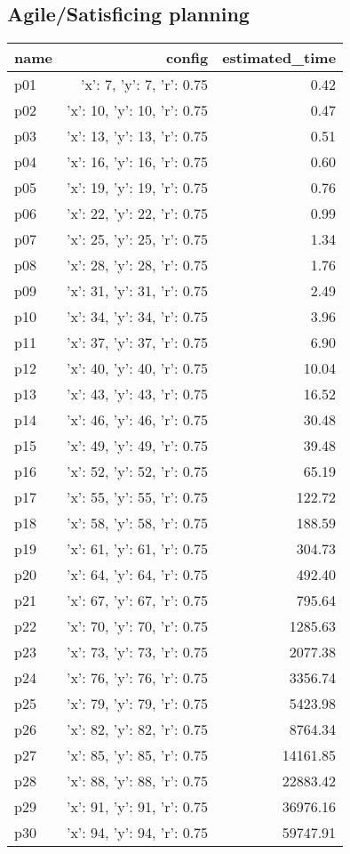 \documentclass{article}
\begin{document}
                                \subsection*{Agile/Satisficing planning}
                                
                            \begin{center}
                            \scriptsize
                            \begin{tabular}{@{}l|r|r@{}}
                            name & config & estimated\_time\\\midrule
                              p01&{'x': 7, 'y': 7, 'r': 0.75}&0.42\\
  p02&{'x': 10, 'y': 10, 'r': 0.75}&0.47\\
  p03&{'x': 13, 'y': 13, 'r': 0.75}&0.51\\
  p04&{'x': 16, 'y': 16, 'r': 0.75}&0.60\\
  p05&{'x': 19, 'y': 19, 'r': 0.75}&0.76\\
  p06&{'x': 22, 'y': 22, 'r': 0.75}&0.99\\
  p07&{'x': 25, 'y': 25, 'r': 0.75}&1.34\\
  p08&{'x': 28, 'y': 28, 'r': 0.75}&1.76\\
  p09&{'x': 31, 'y': 31, 'r': 0.75}&2.49\\
  p10&{'x': 34, 'y': 34, 'r': 0.75}&3.96\\
  p11&{'x': 37, 'y': 37, 'r': 0.75}&6.90\\
  p12&{'x': 40, 'y': 40, 'r': 0.75}&10.04\\
  p13&{'x': 43, 'y': 43, 'r': 0.75}&16.52\\
  p14&{'x': 46, 'y': 46, 'r': 0.75}&30.48\\
  p15&{'x': 49, 'y': 49, 'r': 0.75}&39.48\\
  p16&{'x': 52, 'y': 52, 'r': 0.75}&65.19\\
  p17&{'x': 55, 'y': 55, 'r': 0.75}&122.72\\
  p18&{'x': 58, 'y': 58, 'r': 0.75}&188.59\\
  p19&{'x': 61, 'y': 61, 'r': 0.75}&304.73\\
  p20&{'x': 64, 'y': 64, 'r': 0.75}&492.40\\
  p21&{'x': 67, 'y': 67, 'r': 0.75}&795.64\\
  p22&{'x': 70, 'y': 70, 'r': 0.75}&1285.63\\
  p23&{'x': 73, 'y': 73, 'r': 0.75}&2077.38\\
  p24&{'x': 76, 'y': 76, 'r': 0.75}&3356.74\\
  p25&{'x': 79, 'y': 79, 'r': 0.75}&5423.98\\
  p26&{'x': 82, 'y': 82, 'r': 0.75}&8764.34\\
  p27&{'x': 85, 'y': 85, 'r': 0.75}&14161.85\\
  p28&{'x': 88, 'y': 88, 'r': 0.75}&22883.42\\
  p29&{'x': 91, 'y': 91, 'r': 0.75}&36976.16\\
  p30&{'x': 94, 'y': 94, 'r': 0.75}&59747.91
                            \end{tabular}
                            \end{center}
                    
\end{document}
